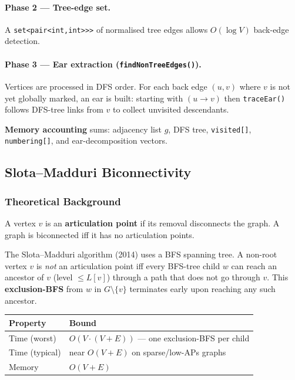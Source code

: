 \documentclass[12pt,a4paper]{article}
\newcommand{\code}[1]{\texttt{#1}}
\begin{document}
\paragraph{Phase 2 --- Tree-edge set.}
A \code{set<pair<int,int>{>}{>}} of normalised tree edges allows $O(\log V)$
back-edge detection.

\paragraph{Phase 3 --- Ear extraction (\code{findNonTreeEdges()}).}
Vertices are processed in DFS order.  For each back edge $(u,v)$ where $v$
is not yet globally marked, an ear is built: starting with $(u \to v)$
then \code{traceEar()} follows DFS-tree links from $v$ to collect
unvisited descendants.

\textbf{Memory accounting} sums: adjacency list $g$, DFS tree,
\code{visited[]}, \code{numbering[]}, and ear-decomposition vectors.

\subsection{Slota--Madduri Biconnectivity}

\subsubsection{Theoretical Background}

A vertex $v$ is an \textbf{articulation point} if its removal disconnects
the graph.  A graph is biconnected iff it has no articulation points.

The Slota--Madduri algorithm (2014) uses a BFS spanning tree.  A non-root
vertex $v$ is \emph{not} an articulation point iff every BFS-tree child
$w$ can reach an ancestor of $v$ (level $\leq L[v]$) through a path that
does not go through $v$.  This
\textbf{exclusion-BFS} from $w$ in $G \setminus \{v\}$ terminates early
upon reaching any such ancestor.

\begin{center}
\begin{tabular}{|l|l|}
\hline
\textbf{Property} & \textbf{Bound} \\ \hline
Time (worst)   & $O\!\left(V \cdot (V+E)\right)$ --- one exclusion-BFS per child \\ \hline
Time (typical) & near $O(V+E)$ on sparse/low-APs graphs \\ \hline
Memory         & $O(V + E)$ \\ \hline
\end{tabular}
\end{center}
\end{document}
